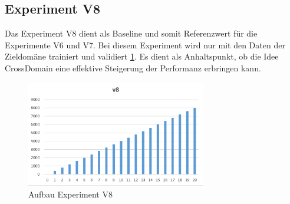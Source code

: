 \subsection{Experiment V8}
Das Experiment V8 dient als Baseline und somit Referenzwert für die Experimente V6 und V7.
Bei diesem Experiment wird nur mit den Daten der Zieldomäne trainiert und validiert \ref{fig:Method_V8}. Es dient als Anhaltspunkt, ob die Idee CrossDomain eine effektive  Steigerung der Performanz erbringen kann.
\begin{figure}[htbp]
	\centering
	\includegraphics[width=0.7\textwidth]{img/Method_V8}
	\caption{Aufbau Experiment V8}
	\label{fig:Method_V8}
\end{figure}
